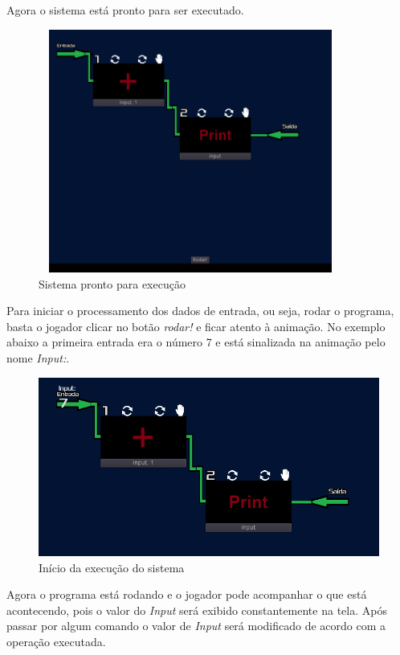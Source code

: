 Agora o sistema está pronto para ser executado.

\begin{figure}[H]
    \includegraphics[width=100mm, height=80mm]{../figuras/sistema_pronto.png}
    \caption{Sistema pronto para execu\c{c}\~{a}o}
\end{figure}

Para iniciar o processamento dos dados de entrada, ou seja, rodar o programa,
basta o jogador clicar no botão \textit{rodar!} e ficar atento à animação.
No exemplo abaixo a primeira entrada era o número 7 e está sinalizada na 
animação pelo nome \textit{Input:}.

\begin{figure}[H]
    \includegraphics[width=\textwidth]{../figuras/inicio_da_execucao.png}
    \caption{Início da execu\c{c}\~{a}o do sistema}
\end{figure}

Agora o programa está rodando e o jogador pode acompanhar o que está 
acontecendo, pois o valor do \textit{Input} será exibido constantemente na tela.
Após passar por algum comando o valor de \textit{Input} será modificado de 
acordo com a operação executada.

